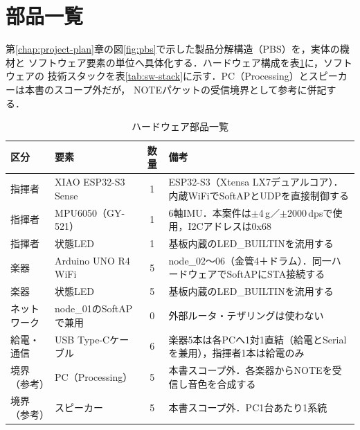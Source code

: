 \documentclass[lualatex,book,paper=a4paper,jafontsize=11.5pt,jafontscale=1.05]{jlreq}
\begin{document}
\section{部品一覧}\label{sec:parts-list}

第\ref{chap:project-plan}章の図\ref{fig:pbs}で示した製品分解構造（PBS）を，実体の機材と
ソフトウェア要素の単位へ具体化する．ハードウェア構成を表\ref{tab:hw-parts}に，ソフトウェアの
技術スタックを表\ref{tab:sw-stack}に示す．PC（Processing）とスピーカーは本書のスコープ外だが，
NOTEパケットの受信境界として参考に併記する．

\begin{table}[H]\centering
  \caption{ハードウェア部品一覧}\label{tab:hw-parts}
  \small
  \begin{tabularx}{\linewidth}{>{\raggedright\arraybackslash}p{1.9cm} >{\raggedright\arraybackslash}p{3.4cm} c X}
    \toprule
    区分 & 要素 & 数量 & 備考 \\
    \midrule
    指揮者 & XIAO ESP32-S3 Sense & 1 & ESP32-S3（Xtensa LX7デュアルコア）．内蔵WiFiでSoftAPとUDPを直接制御する \\
    指揮者 & MPU6050（GY-521） & 1 & 6軸IMU．本案件は$\pm$4\,g／$\pm$2000\,dpsで使用，I2Cアドレスは0x68 \\
    指揮者 & 状態LED & 1 & 基板内蔵のLED\_BUILTINを流用する \\
    楽器 & Arduino UNO R4 WiFi & 5 & node\_02〜06（金管4＋ドラム）．同一ハードウェアでSoftAPにSTA接続する \\
    楽器 & 状態LED & 5 & 基板内蔵のLED\_BUILTINを流用する \\
    ネットワーク & node\_01のSoftAPで兼用 & 0 & 外部ルータ・テザリングは使わない \\
    給電・通信 & USB Type-Cケーブル & 6 & 楽器5本は各PCへ1対1直結（給電とSerialを兼用），指揮者1本は給電のみ \\
    境界（参考） & PC（Processing） & 5 & 本書スコープ外．各楽器からNOTEを受信し音色を合成する \\
    境界（参考） & スピーカー & 5 & 本書スコープ外．PC1台あたり1系統 \\
    \bottomrule
  \end{tabularx}
\end{table}
\end{document}
